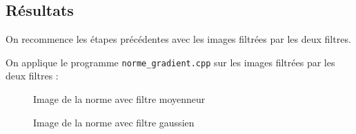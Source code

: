 \documentclass[french,a4paper,10pt]{article}
\begin{document}
    \newpage
    \subsection{Résultats}\label{subsec:4.3}

    On recommence les étapes précédentes avec les images filtrées par les deux filtres.

    On applique le programme \texttt{norme\_gradient.cpp} sur les images filtrées par les deux filtres : %

    \begin{figure}[!htb]
        \begin{minipage}{0.48\textwidth}
            \centering
            \caption{Image de la norme avec filtre moyenneur}\label{Fig:gradient-filtre-moyenneur-peppers-grey}
        \end{minipage}\hfill
        \begin{minipage}{0.48\textwidth}
            \centering
            \caption{Image de la norme avec filtre gaussien}\label{Fig:gradient-filtre-gaussien-peppers-grey}
        \end{minipage}
    \end{figure}
\end{document}
